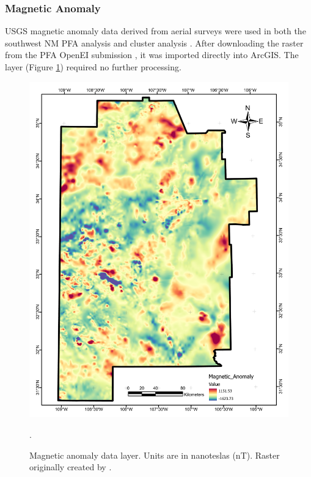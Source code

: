 \subsubsection{Magnetic Anomaly}

USGS magnetic anomaly data derived from aerial surveys \citep{bankey_digital_2002} were used in both the southwest NM PFA analysis \citep{bielicki_hydrogeolgic_2015} and cluster analysis \citep{pepin_new_2018}. After downloading the raster from the PFA OpenEI submission \citep{kelley_geothermal_2015}, it was imported directly into ArcGIS. The layer (Figure \ref{fig:feat_magnetics}) required no further processing.

\begin{figure}[!htp]
\centering
\includegraphics[scale=.50]{templates/images/Figure-MagneticAnomaly.pdf}
\caption[Magnetic anomaly data layer]{Magnetic anomaly data layer. Units are in nanoteslas (nT). Raster originally created by \protect\citet{bielicki_hydrogeolgic_2015}.}.
\label{fig:feat_magnetics}
\end{figure}

